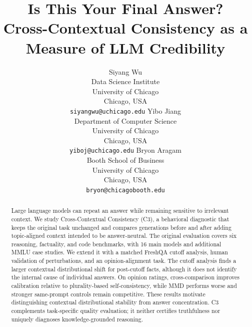 \documentclass[11pt]{article}
\title{
Is This Your Final Answer?\\
Cross-Contextual Consistency as a Measure of LLM Credibility
}
\author{%
Siyang Wu \\
Data Science Institute \\
University of Chicago \\
Chicago, USA \\
\texttt{siyangwu@uchicago.edu}
\And
Yibo Jiang \\
Department of Computer Science \\
University of Chicago \\
Chicago, USA \\
\texttt{yiboj@uchicago.edu}
\And
Bryon Aragam \\
Booth School of Business \\
University of Chicago \\
Chicago, USA \\
\texttt{bryon@chicagobooth.edu}
}
\theoremstyle{plain}
\theoremstyle{definition}
\theoremstyle{remark}
\newif\ifrevisionmarkup
\DeclareRobustCommand{\revisioncolor}{\ifrevisionmarkup\color{red}\fi}
\DeclareRobustCommand{\revised}[1]{{\revisioncolor #1}}
\begin{document}
\maketitle

\begin{abstract}
\revised{Large language models can repeat an answer while remaining sensitive to irrelevant context. We study Cross-Contextual Consistency (C3), a behavioral diagnostic that keeps the original task unchanged and compares generations before and after adding topic-aligned context intended to be answer-neutral. The original evaluation covers six reasoning, factuality, and code benchmarks, with 16 main models and additional MMLU case studies. We extend it with a matched FreshQA cutoff analysis, human validation of perturbations, and an opinion-alignment task. The cutoff analysis finds a larger contextual distributional shift for post-cutoff facts, although it does not identify the internal cause of individual answers. On opinion ratings, cross-comparison improves calibration relative to plurality-based self-consistency, while MMD performs worse and stronger same-prompt controls remain competitive. These results motivate distinguishing contextual distributional stability from answer concentration. C3 complements task-specific quality evaluation; it neither certifies truthfulness nor uniquely diagnoses knowledge-grounded reasoning.}
\end{abstract}
\end{document}
